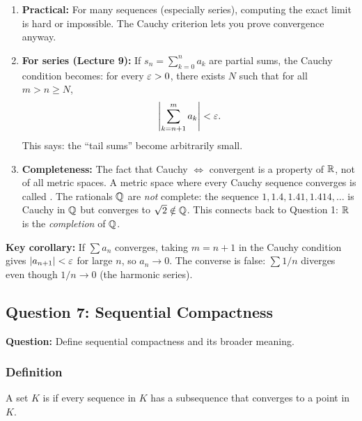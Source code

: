 \documentclass[../master/master.tex]{subfiles}
\begin{document}
\begin{enumerate}
    \item \textbf{Practical:} For many sequences (especially series), computing the exact limit is hard or impossible. The Cauchy criterion lets you prove convergence anyway.

    \item \textbf{For series (Lecture 9):} If $s_n = \sum_{k=0}^n a_k$ are partial sums, the Cauchy condition becomes: for every $\varepsilon > 0$, there exists $N$ such that for all $m > n \geq N$,
    \[
    \left|\sum_{k=n+1}^{m} a_k\right| < \varepsilon.
    \]
    This says: the ``tail sums'' become arbitrarily small.

    \item \textbf{Completeness:} The fact that Cauchy $\iff$ convergent is a property of $\mathbb{R}$, not of all metric spaces. A metric space where every Cauchy sequence converges is called . The rationals $\mathbb{Q}$ are \emph{not} complete: the sequence $1, 1.4, 1.41, 1.414, \ldots$ is Cauchy in $\mathbb{Q}$ but converges to $\sqrt{2} \notin \mathbb{Q}$. This connects back to Question 1: $\mathbb{R}$ is the \emph{completion} of $\mathbb{Q}$.
\end{enumerate}

\begin{notebox}
\textbf{Key corollary:} If $\sum a_n$ converges, taking $m = n+1$ in the Cauchy condition gives $|a_{n+1}| < \varepsilon$ for large $n$, so $a_n \to 0$. The converse is false: $\sum 1/n$ diverges even though $1/n \to 0$ (the harmonic series).
\end{notebox}

\newpage
\subsection{Question 7: Sequential Compactness}

\begin{summarybox}
\textbf{Question:} Define sequential compactness and its broader meaning.
\end{summarybox}

\subsubsection*{Definition}

A set $K$ is  if every sequence in $K$ has a subsequence that converges to a point in $K$.
\end{document}
